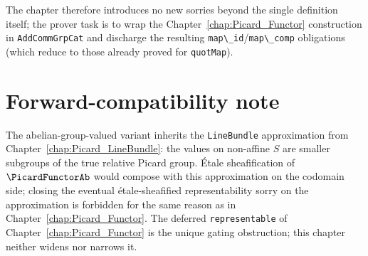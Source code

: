 The chapter therefore introduces no new sorries beyond the single definition itself; the prover task is to wrap the Chapter~\ref{chap:Picard_Functor} construction in \lstinline{AddCommGrpCat} and discharge the resulting \lstinline{map\_id}/\lstinline{map\_comp} obligations (which reduce to those already proved for \lstinline{quotMap}).

\section{Forward-compatibility note}

The abelian-group-valued variant inherits the \lstinline{LineBundle} approximation from Chapter~\ref{chap:Picard_LineBundle}: the values on non-affine $S$ are smaller subgroups of the true relative Picard group. Étale sheafification of $\PicardFunctorAb$ would compose with this approximation on the codomain side; closing the eventual étale-sheafified representability sorry on the approximation is forbidden for the same reason as in Chapter~\ref{chap:Picard_Functor}. The deferred \lstinline{representable} of Chapter~\ref{chap:Picard_Functor} is the unique gating obstruction; this chapter neither widens nor narrows it.
